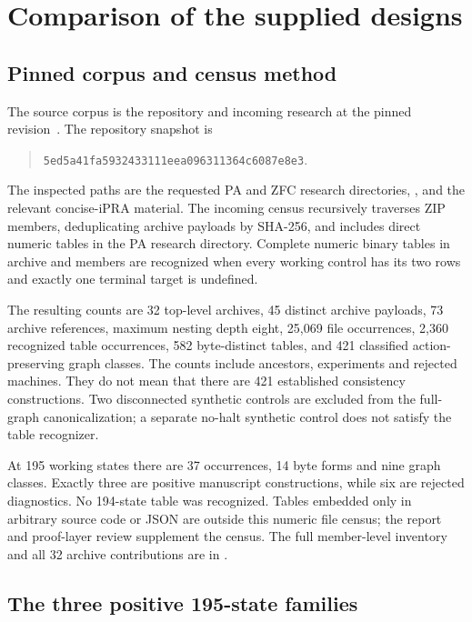 \section{Comparison of the supplied designs}
\label{sec:comparison}

\subsection{Pinned corpus and census method}

The source corpus is the repository and incoming research at the pinned
revision~\cite{repo,incoming}. The repository snapshot is
\begin{quote}\small
\nolinkurl{5ed5a41fa5932433111eea096311364c6087e8e3}.
\end{quote}
The inspected paths are the requested PA and ZFC research directories,
, and the relevant concise-iPRA material.
The incoming census recursively traverses ZIP members, deduplicating archive
payloads by SHA-256, and includes direct numeric  tables in the PA
research directory. Complete numeric binary tables in archive 
and  members are recognized when every working control has its
two rows and exactly one terminal target is undefined.

The resulting counts are 32 top-level archives, 45 distinct archive payloads,
73 archive references, maximum nesting depth eight, 25,069 file occurrences,
2,360 recognized table occurrences, 582 byte-distinct tables, and 421
classified action-preserving graph classes. The counts include ancestors,
experiments and rejected machines. They do not mean that there are 421
established consistency constructions. Two disconnected synthetic controls
are excluded from the full-graph canonicalization; a separate no-halt
synthetic control does not satisfy the table recognizer.

At 195 working states there are 37 occurrences, 14 byte forms and nine
graph classes. Exactly three are positive manuscript constructions, while
six are rejected diagnostics. No 194-state table was recognized. Tables
embedded only in arbitrary source code or JSON are outside this numeric
file census; the report and proof-layer review supplement the census.
The full member-level inventory and all 32 archive contributions are in
.

\subsection{The three positive 195-state families}

